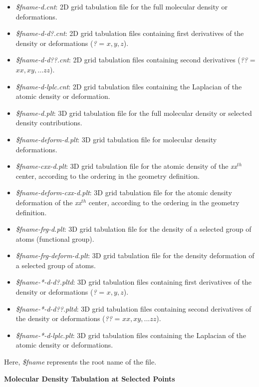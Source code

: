 \documentclass[10pt]{article}
\begin{document}
\begin{itemize}
\item {\it \$fname-d.cnt}: 2D grid tabulation file for the full molecular density or deformations.
\item {\it \$fname-d-d?.cnt}: 2D grid tabulation files containing first derivatives of the density or deformations ({\it ?} = $x, y, z$).
\item {\it \$fname-d-d??.cnt}: 2D grid tabulation files containing second derivatives ({\it ??} = $xx, xy, ... zz$).
\item {\it \$fname-d-lplc.cnt}: 2D grid tabulation files containing the Laplacian of the atomic density or deformation.
\item {\it \$fname-d.plt}: 3D grid tabulation file for the full molecular density or selected density contributions.
\item {\it \$fname-deform-d.plt}: 3D grid tabulation file for molecular density deformations.
\item {\it \$fname-cxx-d.plt}: 3D grid tabulation file for the atomic density of the {\it xx$^{th}$} center,
according to the ordering in the geometry definition.
\item {\it \$fname-deform-cxx-d.plt}: 3D grid tabulation file for the atomic density deformation
of the {\it xx$^{th}$} center, according to the ordering in the geometry definition.
\item {\it \$fname-frg-d.plt}: 3D grid tabulation file for the density of a selected group of atoms (functional group).
\item {\it \$fname-frg-deform-d.plt}: 3D grid tabulation file for the density deformation of a selected group of atoms.
\item {\it \$fname-*-d-d?.pltd}: 3D grid tabulation files containing first derivatives of the density or deformations ({\it ?} = $x, y, z$).
\item {\it \$fname-*-d-d??.pltd}: 3D grid tabulation files containing second derivatives of the density or deformations ({\it ??} = $xx, xy, ... zz$).
\item {\it \$fname-*-d-lplc.plt}: 3D grid tabulation files containing the Laplacian of the atomic density or deformations.
\end{itemize}
%
Here, {\it \$fname} represents the root name of the file.

\vspace*{3mm}
{\bf Molecular Density Tabulation at Selected Points}
\vspace*{3mm}
\end{document}
